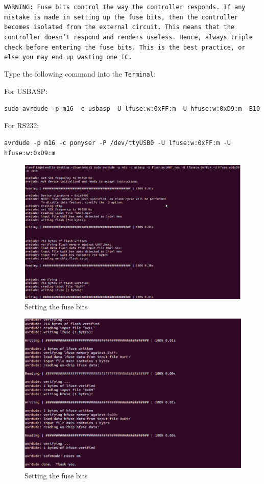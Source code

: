 \documentclass[12pt]{article}
\begin{document}
\texttt{WARNING: Fuse bits control the way the controller responds. If any mistake is made in setting up the fuse bits, then the controller becomes isolated from the external circuit. This means that the controller doesn't respond and renders useless. Hence, always triple check before entering the fuse bits. This is the best practice, or else you may end up wasting one IC.}

\vspace{12pt} Type the following command into the \texttt{Terminal}:

\vspace{12pt}

For USBASP:
\vspace{12pt}

\texttt{sudo avrdude -p m16 -c usbasp -U lfuse:w:0xFF:m -U hfuse:w:0xD9:m -B10}\vspace{12pt}

For RS232:\vspace{12pt}


\texttt{avrdude -p m16 -c ponyser -P /dev/ttyUSB0 -U lfuse:w:0xFF:m -U hfuse:w:0xD9:m }\newpage

\begin{figure}[h!]
\centering
\includegraphics[scale=0.5]{fuse1.png}
\caption{Setting the fuse bits}
\end{figure}	 
\newpage
\begin{figure}
\centering
\includegraphics[scale=0.5]{fuse2.png}
\caption{Setting the fuse bits}
\end{figure}
\end{document}
